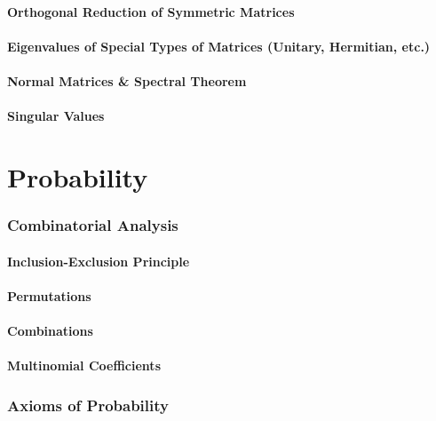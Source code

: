 \documentclass[11pt]{article}
\theoremstyle{definition}
\theoremstyle{plain}
\theoremstyle{remark}
\begin{document}
\subsection{Orthogonal Reduction of Symmetric Matrices}

\subsection{Eigenvalues of Special Types of Matrices (Unitary, Hermitian, etc.)}

\subsection{Normal Matrices \& Spectral Theorem}

\subsection{Singular Values}

\part{Probability}

\section{Combinatorial Analysis}

\subsection{Inclusion-Exclusion Principle}

\subsection{Permutations}

\subsection{Combinations}

\subsection{Multinomial Coefficients}

\section{Axioms of Probability}
\end{document}

